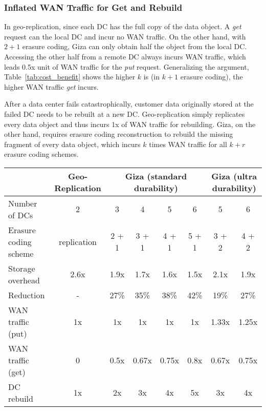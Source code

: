 \subsubsection{Inflated WAN Traffic for Get and Rebuild}

In geo-replication, since each DC has the full copy of the data object. A {\em get} request can the local DC and incur no WAN traffic. On the other hand, with $2+1$ erasure coding, Giza can only obtain half the object from the local DC. Accessing the other half from a remote DC always incurs WAN traffic, which leads 0.5x unit of WAN traffic for the {\em put} request. Generalizing the argument, Table~\ref{tab:cost_benefit} shows the higher $k$ is (in $k+1$ erasure coding), the higher WAN traffic {\em get} incurs.

After a data center fails catastrophically, customer data originally stored at the failed DC needs to be rebuilt at a new DC. Geo-replication simply replicates every data object and thus incurs 1x of WAN traffic for rebuilding. Giza, on the other hand, requires erasure coding reconstruction to rebuild the missing fragment of every data object, which incurs $k$ times WAN traffic for all $k+r$ erasure coding schemes.

\begin{table*}[thp]
\centering
\begin{tabular}{|l||c||c|c|c|c||c|c|}
\hline
				& Geo-Replication    	& \multicolumn{4}{c||}{Giza (standard durability)}		& \multicolumn{2}{c|}{Giza (ultra durability)}
\\ \hline \hline
Number of DCs 				& 2										& 3 & 4 & 5 & 6									& 5 & 6
\\ \hline
Erasure coding scheme & replication					& 2 + 1 & 3 + 1 & 4 + 1 & 5 + 1	& 3 + 2 & 4 + 2
\\ \hline \hline
Storage overhead			& 2.6x								& 1.9x & 1.7x & 1.6x & 1.5x			& 2.1x & 1.9x
\\ \hline
Reduction							& -										& 27\% & 35\% & 38\% & 42\%			& 19\% & 27\%
\\ \hline \hline
WAN traffic (put)			& 1x									& 1x & 1x & 1x & 1x 						& 1.33x & 1.25x
\\ \hline
WAN traffic (get)			& 0										& 0.5x & 0.67x & 0.75x & 0.8x		& 0.67x & 0.75x
\\ \hline
DC rebuild 						& 1x									& 2x & 3x & 4x & 5x 						& 3x & 4x
\\ \hline \hline
\end{tabular}
\caption{Trade-off of storage, bandwidth and durability.}
\label{tab:cost_benefit}
\end{table*}

